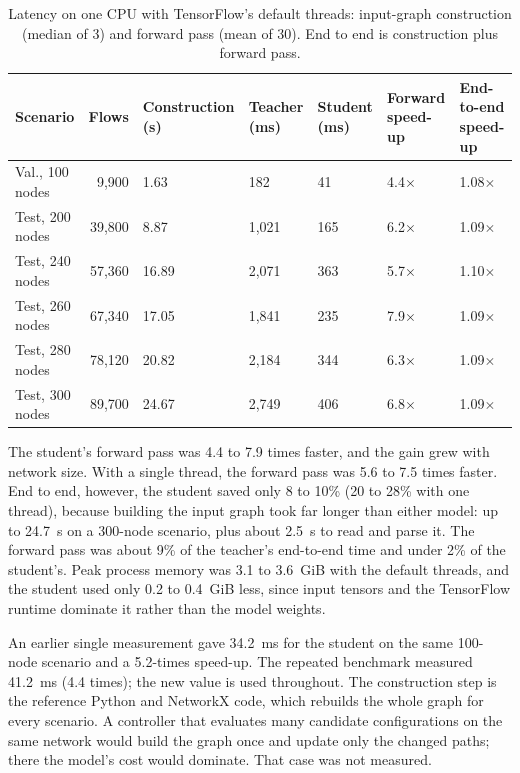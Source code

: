 \begin{table}[ht]
\centering
\small
\caption{Latency on one CPU with TensorFlow's default threads: input-graph construction (median of 3) and forward pass (mean of 30). End to end is construction plus forward pass.}
\label{tab:efficiency}
\begin{tabular}{@{}l r C{20mm} C{14mm} C{14mm} C{16mm} C{18mm}@{}}
\toprule
\textbf{Scenario} & \textbf{Flows} & \textbf{Construction (s)} & \textbf{Teacher (ms)} & \textbf{Student (ms)} & \textbf{Forward speed-up} & \textbf{End-to-end speed-up} \\
\midrule
Val., 100 nodes       & 9,900  & 1.63  & 182   & 41  & 4.4$\times$ & 1.08$\times$ \\
Test, 200 nodes       & 39,800 & 8.87  & 1,021 & 165 & 6.2$\times$ & 1.09$\times$ \\
Test, 240 nodes       & 57,360 & 16.89 & 2,071 & 363 & 5.7$\times$ & 1.10$\times$ \\
Test, 260 nodes       & 67,340 & 17.05 & 1,841 & 235 & 7.9$\times$ & 1.09$\times$ \\
Test, 280 nodes       & 78,120 & 20.82 & 2,184 & 344 & 6.3$\times$ & 1.09$\times$ \\
Test, 300 nodes       & 89,700 & 24.67 & 2,749 & 406 & 6.8$\times$ & 1.09$\times$ \\
\bottomrule
\end{tabular}
\end{table}

The student's forward pass was 4.4 to 7.9 times faster, and the gain grew with network size. With a single thread, the forward pass was 5.6 to 7.5 times faster. End to end, however, the student saved only 8 to 10\% (20 to 28\% with one thread), because building the input graph took far longer than either model: up to 24.7~s on a 300-node scenario, plus about 2.5~s to read and parse it. The forward pass was about 9\% of the teacher's end-to-end time and under 2\% of the student's. Peak process memory was 3.1 to 3.6~GiB with the default threads, and the student used only 0.2 to 0.4~GiB less, since input tensors and the TensorFlow runtime dominate it rather than the model weights.

An earlier single measurement gave 34.2~ms for the student on the same 100-node scenario and a 5.2-times speed-up. The repeated benchmark measured 41.2~ms (4.4 times); the new value is used throughout. The construction step is the reference Python and NetworkX code, which rebuilds the whole graph for every scenario. A controller that evaluates many candidate configurations on the same network would build the graph once and update only the changed paths; there the model's cost would dominate. That case was not measured.

